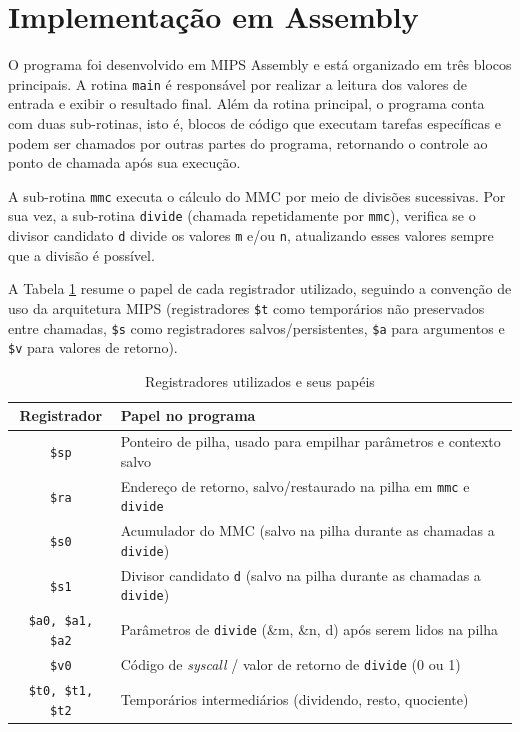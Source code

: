 \section{Implementação em Assembly}
\label{sec:assembly}

O programa foi desenvolvido em MIPS Assembly e está organizado em três blocos principais. A rotina \texttt{main} é responsável por realizar a leitura dos valores de entrada e exibir o resultado final. Além da rotina principal, o programa conta com duas sub-rotinas, isto é, blocos de código que executam tarefas específicas e podem ser chamados por outras partes do programa, retornando o controle ao ponto de chamada após sua execução. 

A sub-rotina \texttt{mmc} executa o cálculo do MMC por meio de divisões sucessivas. Por sua vez, a sub-rotina \texttt{divide} (chamada repetidamente por \texttt{mmc}), verifica se o divisor candidato \texttt{d} divide os valores \texttt{m} e/ou \texttt{n}, atualizando esses valores sempre que a divisão é possível.

A Tabela \ref{tab:registradores} resume o papel de cada registrador 
utilizado, seguindo a convenção de uso da arquitetura 
MIPS (registradores \texttt{\$t} como temporários não preservados entre 
chamadas, \texttt{\$s} como registradores salvos/persistentes, \texttt{\$a} para 
argumentos e \texttt{\$v} para valores de retorno).

\begin{table}[h]
\centering
\begin{tabularx}{\textwidth}{|c|X|}
\hline
\textbf{Registrador} & \textbf{Papel no programa} \\
\hline
\texttt{\$sp} & Ponteiro de pilha, usado para empilhar parâmetros e contexto salvo \\
\hline
\texttt{\$ra} & Endereço de retorno, salvo/restaurado na pilha em \texttt{mmc} e \texttt{divide} \\
\hline
\texttt{\$s0} & Acumulador do MMC (salvo na pilha durante as chamadas a \texttt{divide}) \\
\hline
\texttt{\$s1} & Divisor candidato \texttt{d} (salvo na pilha durante as chamadas a \texttt{divide}) \\
\hline
\texttt{\$a0, \$a1, \$a2} & Parâmetros de \texttt{divide} (\&m, \&n, d) após serem lidos na pilha \\
\hline
\texttt{\$v0} & Código de \textit{syscall} / valor de retorno de \texttt{divide} (0 ou 1) \\
\hline
\texttt{\$t0, \$t1, \$t2} & Temporários intermediários (dividendo, resto, quociente) \\
\hline
\end{tabularx}
\caption{Registradores utilizados e seus papéis}
\label{tab:registradores}
\end{table}

